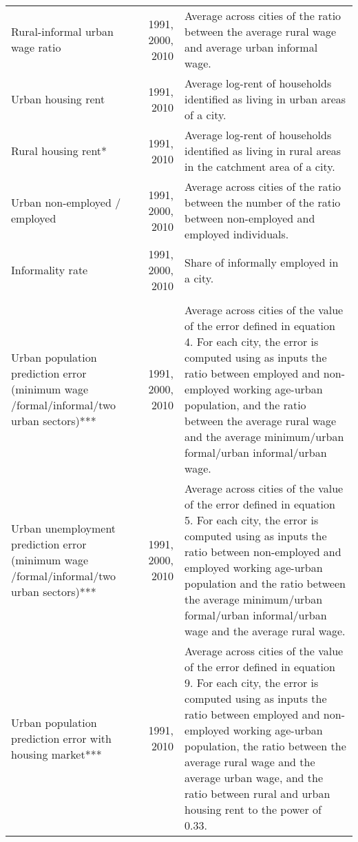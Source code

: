 \begin{sidewaystable}[htbp]
\begin{tabular}{p{14.445em}rp{37.89em}}
    Rural-informal urban wage ratio & \multicolumn{1}{p{7.055em}}{1991, 2000, 2010} & Average across cities of the ratio between the average rural wage and average urban informal wage. \\
    Urban housing rent & \multicolumn{1}{p{7.055em}}{1991, 2010} & Average log-rent of households identified as living in urban areas of a city.  \\
    Rural housing rent* & \multicolumn{1}{p{7.055em}}{1991, 2010} & Average log-rent of households identified as living in rural areas in the catchment area of a city.  \\
    Urban non-employed / employed & \multicolumn{1}{p{7.055em}}{1991, 2000, 2010} & Average across cities of the ratio between the number of the ratio between non-employed  and employed individuals. \\
    Informality rate & \multicolumn{1}{p{7.055em}}{1991, 2000, 2010} & Share of informally employed in a city. \\
    \multicolumn{1}{r}{} &       & \multicolumn{1}{r}{} \\
    Urban population prediction error (minimum wage /formal/informal/two urban sectors)*** & \multicolumn{1}{p{7.055em}}{1991, 2000, 2010} & Average across cities of the value of the error defined in equation 4. For each city, the error is computed using as inputs the ratio between employed and non-employed working age-urban population, and the ratio between the average rural wage and the average minimum/urban formal/urban informal/urban wage.  \\
    Urban unemployment prediction error (minimum wage /formal/informal/two urban sectors)*** & \multicolumn{1}{p{7.055em}}{1991, 2000, 2010} &   Average across cities of the value of the error defined in equation 5. For each city, the error is computed using as inputs the ratio between non-employed and employed working age-urban population and the ratio between the average minimum/urban formal/urban informal/urban wage and the average rural wage.  \\
    Urban population prediction error with housing market*** & \multicolumn{1}{p{7.055em}}{1991,  2010} &   Average across cities of the value of the error defined in equation 9. For each city, the error is computed using as inputs the ratio between employed and non-employed working age-urban population, the ratio between the average rural wage and the average urban wage, and the ratio between rural and urban housing rent to the power of 0.33.  \\

\end{tabular}
\end{sidewaystable}
